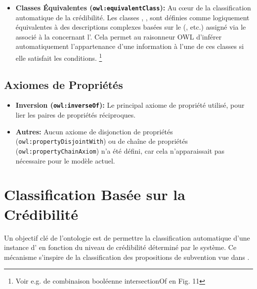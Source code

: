 \documentclass[9pt,twocolumn,twoside,french]{article}
\begin{document}
\begin{itemize}
\begin{itemize}
            \item \texttt{owl:complementOf} est utilisé dans les définitions des classes  et  pour exclure explicitement les informations appartenant déjà à une catégorie de crédibilité supérieure.
        \end{itemize}
    \item \textbf{Classes Équivalentes (\texttt{owl:equivalentClass}):} Au cœur de la classification automatique de la crédibilité. Les classes , ,  sont définies comme logiquement équivalentes à des descriptions complexes basées sur le  (, etc.) assigné via le  associé à la  concernant l'. Cela permet au raisonneur OWL d'inférer automatiquement l'appartenance d'une information à l'une de ces classes si elle satisfait les conditions. \footnote{Voir e.g. de combinaison booléenne intersectionOf en Fig. 11}
\end{itemize}

\subsection{Axiomes de Propriétés}
\begin{itemize}
    \item \textbf{Inversion (\texttt{owl:inverseOf}):} Le principal axiome de propriété utilisé, pour lier les paires de propriétés réciproques.
    \item \textbf{Autres:} Aucun axiome de disjonction de propriétés (\texttt{owl:propertyDisjointWith}) ou de chaîne de propriétés (\texttt{owl:propertyChainAxiom}) n'a été défini, car cela n'apparaissait pas nécessaire pour le modèle actuel.
\end{itemize}

\section{Classification Basée sur la Crédibilité}
\label{sec:classification}

Un objectif clé de l'ontologie est de permettre la classification automatique d'une instance d' en fonction du niveau de crédibilité déterminé par le système. Ce mécanisme s'inspire de la classification des propositions de subvention vue dans \parencite{Loyer2018Rapport}.
\end{document}
